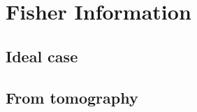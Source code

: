 \documentclass{article}
\begin{document}
\section{Fisher Information}
\subsection{Ideal case}
\subsection{From tomography} 
\end{document}
